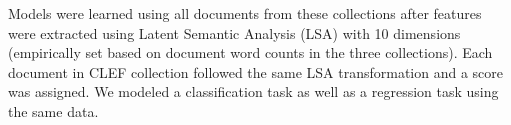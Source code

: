 Models were learned using all documents from these collections after features were extracted using Latent Semantic Analysis (LSA) with 10 dimensions (empirically set based on document word counts in the three collections). Each document in CLEF collection followed the same LSA transformation and a score was assigned. We modeled a classification task as well as a regression task using the same data.





